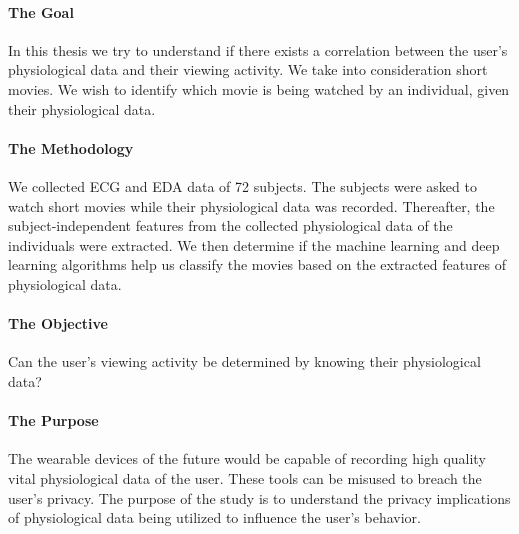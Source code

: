 \paragraph{The Goal} In this thesis we try to understand if there exists a correlation between the user's physiological data and their viewing activity. We take into consideration short movies. We wish to identify which movie is being watched by an individual, given their physiological data.

\paragraph{The Methodology} \label{sec:the_methodology} We collected ECG and EDA data of 72 subjects. The subjects were asked to watch short movies while their physiological data was recorded. Thereafter, the subject-independent features from the collected physiological data of the individuals were extracted. We then determine if the machine learning and deep learning algorithms help us classify the movies based on the extracted features of physiological data.

\paragraph{The Objective} Can the user's viewing activity be determined by knowing their physiological data?

\paragraph{The Purpose} The wearable devices of the future would be capable of recording high quality vital physiological data of the user. These tools can be misused to breach the user's privacy. The purpose of the study is to understand the privacy implications of physiological data being utilized to influence the user's behavior.

